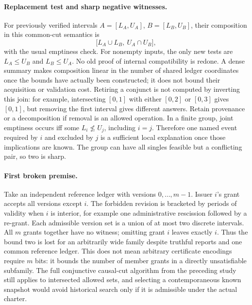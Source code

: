 \documentclass{article}
\begin{document}
\paragraph{Replacement test and sharp negative witnesses.}
For previously verified intervals \(A=[L_A,U_A]\), \(B=[L_B,U_B]\), their composition in this common-cut semantics is
\[
 \big[L_A\cup L_B,\ U_A\cap U_B\big],
\]
with the usual emptiness check. For nonempty inputs, the only new tests are \(L_A\le U_B\) and \(L_B\le U_A\). No old proof of internal compatibility is redone. A dense summary makes composition linear in the number of shared ledger coordinates once the bounds have actually been constructed; it does not bound their acquisition or validation cost. Retiring a conjunct is not computed by inverting this join: for example, intersecting \([0,1]\) with either \([0,2]\) or \([0,3]\) gives \([0,1]\), but removing the first interval gives different answers. Retain provenance or a decomposition if removal is an allowed operation. In a finite group, joint emptiness occurs iff some \(L_i\not\le U_j\), including \(i=j\). Therefore one named event required by \(i\) and excluded by \(j\) is a sufficient local explanation once those implications are known. The group can have all singles feasible but a conflicting pair, so two is sharp.

\paragraph{First broken premise.}
Take an independent reference ledger with versions \(0,\dots,m-1\). Issuer \(i\)'s grant accepts all versions except \(i\). The forbidden revision is bracketed by periods of validity when \(i\) is interior, for example one administrative rescission followed by a re-grant. Each admissible version set is a union of at most two discrete intervals. All \(m\) grants together have no witness; omitting grant \(i\) leaves exactly \(i\). Thus the bound two is lost for an arbitrarily wide family despite truthful reports and one common reference ledger. This does not mean arbitrary certificate encodings require \(m\) bits: it bounds the number of member grants in a directly unsatisfiable subfamily. The full conjunctive causal-cut algorithm from the preceding study still applies to intersected allowed sets, and selecting a contemporaneous known snapshot would avoid historical search only if it is admissible under the actual charter.
\end{document}
